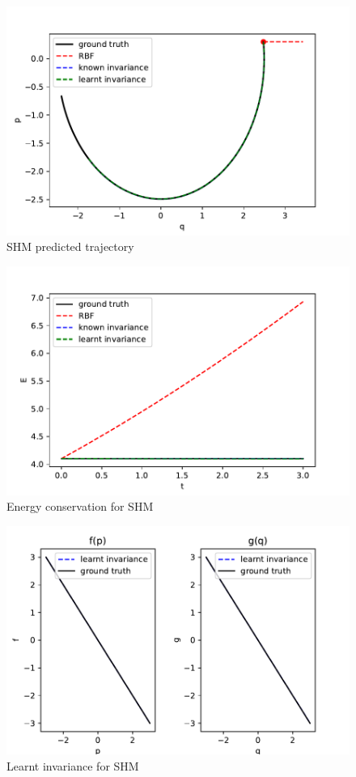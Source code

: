 \documentclass{statsmsc}
\begin{document}
\begin{figure}[H]
        \centering
        \includegraphics[width=0.8\linewidth]{../codes/figures/shm_predicted.pdf}
        \caption{SHM predicted trajectory}
        \label{fig:shm_prediction}
\end{figure}

\begin{figure}[H] 
  \includegraphics[width=0.8\linewidth]{../codes/figures/shm_energy.pdf}
  \centering
  \caption{Energy conservation for SHM}
  \label{fig:shm_energy}
\end{figure}

\begin{figure}[H] 
  \includegraphics[width=0.8\linewidth]{../codes/figures/shm_learnt.pdf}
  \centering
  \caption{Learnt invariance for SHM}
  \label{fig:shm_learnt}
\end{figure}
\end{document}
